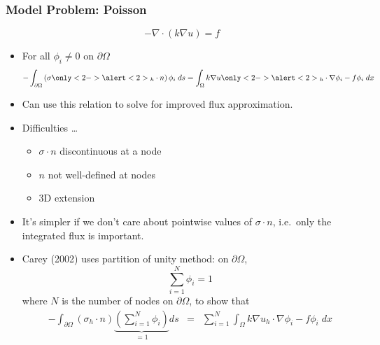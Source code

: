 \begin{frame}
  \frametitle{Model Problem: Poisson}
	\begin{equation}
	  \nonumber
	  -\nabla \cdot \left( k \nabla u \right)=f
	\end{equation}
      \begin{itemize}
      \item<1->{For all $\phi_i \neq 0$ on $\partial \Omega$
      \begin{equation}
	\nonumber
	-\int_{\partial \Omega} \left( \sigma\only<2->{\alert<2>{_h}} \cdot n\right)\phi_i \;ds =
	\int_{\Omega} k\nabla u\only<2->{\alert<2>{_h}} \cdot \nabla \phi_i - f\phi_i \;dx 
	\end{equation}

      }
	
      \item<3->{Can use this relation to solve for improved flux approximation.}

      \item<4->{Difficulties \ldots
	\begin{itemize}
	  \item {$\sigma \cdot n$ discontinuous at a node}
	  \item {$n$ not well-defined at nodes}
	  \item {3D extension}
	\end{itemize}
      }
      \end{itemize}
\end{frame}




\begin{frame}
      \begin{itemize}
      \item{
        It's simpler if we don't care about pointwise values of $\sigma \cdot n$,
	i.e.\ only the integrated flux is
	important.}

      \item{Carey (2002) uses partition of unity method: on $\partial \Omega$,
	\begin{equation}
	  \nonumber
	  \sum_{i=1}^N \phi_i = 1
	\end{equation}
	where $N$ is the number of nodes on $\partial \Omega$, to show that
	\begin{eqnarray}
	  \nonumber
	  -\int_{\partial \Omega} \left(\sigma_h \cdot n\right)
	   \underbrace{\left(\sum_{i=1}^N \phi_i \right)}_{=1} ds &=&
	\sum_{i=1}^N \int_{\Omega} k\nabla u_h \cdot \nabla \phi_i - f\phi_i \;dx
	\end{eqnarray}
      }
      \end{itemize}
\end{frame}




